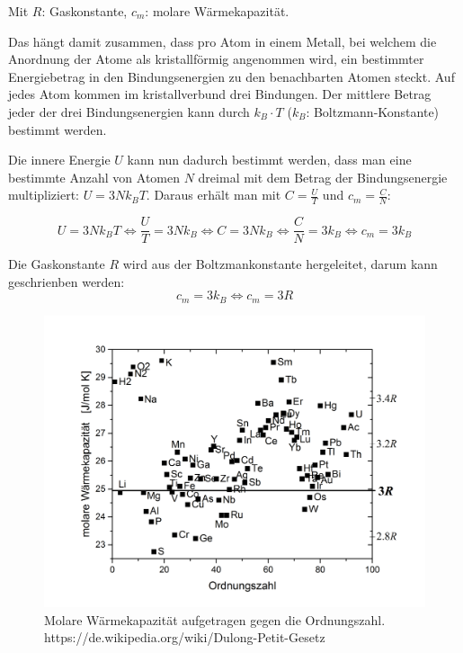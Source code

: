 \documentclass[a4paper, 12pt]{article}
\begin{document}
Mit $R$: Gaskonstante, $c_m$: molare Wärmekapazität. 

\noindent Das hängt damit zusammen, dass pro Atom in einem Metall, bei welchem die Anordnung der Atome als kristallförmig angenommen wird, ein bestimmter Energiebetrag in den Bindungsenergien zu den benachbarten Atomen steckt. Auf jedes Atom kommen im kristallverbund drei Bindungen. Der mittlere Betrag jeder der drei Bindungsenergien kann durch $k_B\cdot T$ ($k_B$: Boltzmann-Konstante) bestimmt werden.

Die innere Energie $U$ kann nun dadurch bestimmt werden, dass man eine bestimmte Anzahl von Atomen $N$ dreimal mit dem Betrag der Bindungsenergie multipliziert: $U=3Nk_BT$.
Daraus erhält man mit $C=\frac{U}{T}$ und $c_m=\frac{C}{N}$:

$$U=3Nk_BT \Leftrightarrow \frac{U}{T}=3Nk_B \Leftrightarrow C=3Nk_B \Leftrightarrow \frac{C}{N}=3k_B \Leftrightarrow c_m=3k_B$$

Die Gaskonstante $R$ wird aus der Boltzmankonstante hergeleitet, darum kann geschrienben werden:
$$c_m=3k_B \Leftrightarrow c_m=3R$$

\begin{figure}[h]
\centering
\includegraphics[width=\textwidth]{DP.png}
\caption{Molare Wärmekapazität aufgetragen gegen die Ordnungszahl. https://de.wikipedia.org/wiki/Dulong-Petit-Gesetz}
\end{figure}
\end{document}
